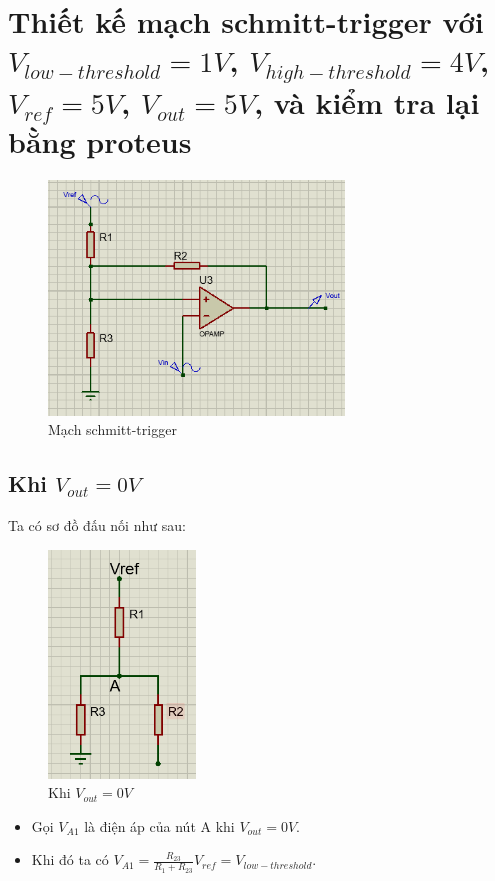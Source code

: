 \cleardoublepage
\section{Thiết kế mạch schmitt-trigger với $V_{low-threshold} = 1V$, $V_{high-threshold} = 4V$, $V_{ref} = 5V$, $V_{out} = 5V$, và kiểm tra lại bằng proteus}
\begin{figure}[H]
    \centering
    \includegraphics[width=0.7\textwidth]{pictures/topic3.png}
    \caption{Mạch schmitt-trigger}
\end{figure}
    \subsection{Khi $V_{out} = 0V$}
Ta có sơ đồ đấu nối như sau:
\begin{figure}[H]
    \centering
    \includegraphics[width=0.35\textwidth]{pictures/topic3_a.png}
    \caption{Khi $V_{out} = 0V$}
\end{figure}
\begin{itemize}
    \item Gọi $V_{A1}$ là điện áp của nút A khi $V_{out} = 0V$.
    \item Khi đó ta có $V_{A1} = \frac{R_{23}}{R_1+R_{23}}V_{ref} = V_{low-threshold}$.
\end{itemize}
